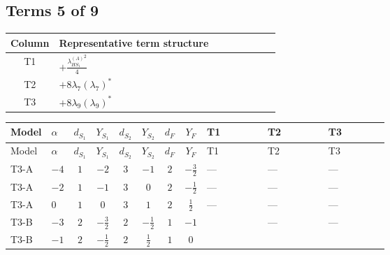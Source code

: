 \documentclass[8pt]{article}
\begin{document}
\begin{landscape}
\subsection*{Terms 5 of 9}
\begin{center}
\begin{tabular}{@{}c >{\raggedright\arraybackslash}p{0.82\linewidth}@{}}
\toprule
Column & Representative term structure \\
\midrule
T1 & \(\displaystyle +\frac{{\lambda_{HS_1}^{(A)}}^2}{4}\) \\
\midrule
T2 & \(\displaystyle +8 {\lambda_{7}} \left({\lambda_{7}}\right)^{*}\) \\
\midrule
T3 & \(\displaystyle +8 {\lambda_{9}} \left({\lambda_{9}}\right)^{*}\) \\
\midrule
\bottomrule
\end{tabular}
\end{center}
\smallskip
\tiny
\begin{longtable}{@{}llcccccc >{\raggedright\arraybackslash}p{0.21\linewidth} >{\raggedright\arraybackslash}p{0.21\linewidth} >{\raggedright\arraybackslash}p{0.21\linewidth}@{}}
\toprule
Model & $\alpha$ & $d_{S_1}$ & $Y_{S_1}$ & $d_{S_2}$ & $Y_{S_2}$ & $d_F$ & $Y_F$ & T1 & T2 & T3 \\
\midrule
\endfirsthead
\toprule
Model & $\alpha$ & $d_{S_1}$ & $Y_{S_1}$ & $d_{S_2}$ & $Y_{S_2}$ & $d_F$ & $Y_F$ & T1 & T2 & T3 \\
\midrule
\endhead
T3-A & $-4$ & $1$ & $-2$ & $3$ & $-1$ & $2$ & $-\frac{3}{2}$ & --- & --- & --- \\
\midrule
T3-A & $-2$ & $1$ & $-1$ & $3$ & $0$ & $2$ & $-\frac{1}{2}$ & --- & --- & --- \\
\midrule
T3-A & $0$ & $1$ & $0$ & $3$ & $1$ & $2$ & $\frac{1}{2}$ & --- & --- & --- \\
\midrule
T3-B & $-3$ & $2$ & $-\frac{3}{2}$ & $2$ & $-\frac{1}{2}$ & $1$ & $-1$ & \scriptsize\adjustbox{max width=\linewidth}{$\begin{gathered} +\frac{{\lambda_{HS_1}^{(A)}}^2}{4}\end{gathered}$} & --- & --- \\
\midrule
T3-B & $-1$ & $2$ & $-\frac{1}{2}$ & $2$ & $\frac{1}{2}$ & $1$ & $0$ & \scriptsize\adjustbox{max width=\linewidth}{$\begin{gathered} +\frac{{\lambda_{HS_1}^{(A)}}^2}{4}\end{gathered}$} & \scriptsize\adjustbox{max width=\linewidth}{$\begin{gathered} +8 {\lambda_{7}} \left({\lambda_{7}}\right)^{*}\end{gathered}$} & \scriptsize\adjustbox{max width=\linewidth}{$\begin{gathered} +8 {\lambda_{9}} \left({\lambda_{9}}\right)^{*}\end{gathered}$} \\

\end{longtable}
\end{landscape}
\end{document}
